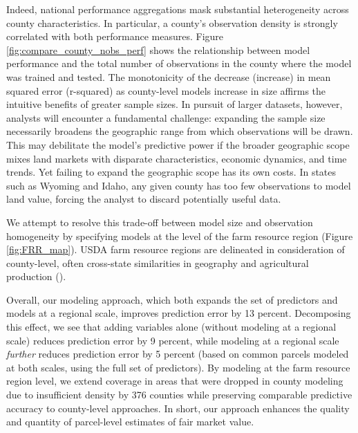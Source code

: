 \documentclass[12pt]{article}
\begin{document}
Indeed, national performance aggregations mask substantial heterogeneity across county characteristics. In particular, a county's observation density is strongly correlated with both performance measures. Figure \ref{fig:compare_county_nobs_perf} shows the relationship between model performance and the total number of observations in the county where the model was trained and tested. The monotonicity of the decrease (increase) in mean squared error (r-squared) as county-level models increase in size affirms the intuitive benefits of greater sample sizes. In pursuit of larger datasets, however, analysts will encounter a fundamental challenge: expanding the sample size necessarily broadens the geographic range from which observations will be drawn. This may debilitate the model's predictive power if the broader geographic scope mixes land markets with disparate characteristics, economic dynamics, and time trends. Yet failing to expand the geographic scope has its own costs. In states such as Wyoming and Idaho, any given county has too few observations to model land value, forcing the analyst to discard potentially useful data.

We attempt to resolve this trade-off between model size and observation homogeneity by specifying models at the level of the farm resource region (Figure \ref{fig:FRR_map}). USDA farm resource regions are delineated in consideration of county-level, often cross-state similarities in geography and agricultural production (\cite{FRR2000}).

Overall, our modeling approach, which both expands the set of predictors and models at a regional scale, improves prediction error by 13 percent. Decomposing this effect, we see that adding variables alone (without modeling at a regional scale) reduces prediction error by 9 percent, while modeling at a regional scale \textit{further} reduces prediction error by 5 percent (based on common parcels modeled at both scales, using the full set of predictors). By modeling at the farm resource region level, we extend coverage in areas that were dropped in county modeling due to insufficient density by 376 counties while preserving comparable predictive accuracy to county-level approaches. In short, our approach enhances the quality and quantity of parcel-level estimates of fair market value. 
\end{document}
